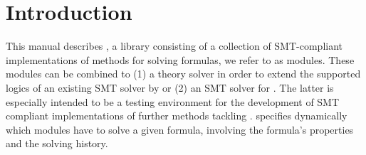 \chapter{Introduction}
\label{chapter:intro}
This manual describes \smtrat, a \Cpp library consisting of a collection of
SMT-compliant implementations of methods for solving \supportedLogicsText 
formulas, we refer to as modules. These modules can be 
combined to (1) a theory solver in order to extend the supported logics of an
existing SMT solver by \supportedLogics or (2) an SMT solver for \supportedLogics. 
The latter is especially intended to be a testing environment for the development 
of SMT compliant implementations of further methods tackling \supportedLogics.
\smtrat specifies dynamically which modules have to solve a 
given \supportedLogics formula, involving the formula's properties and the solving 
history.
